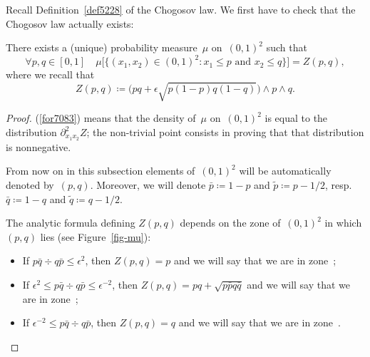 Recall Definition~\ref{def5228} of the Chogosov law.
We first have to check that the Chogosov law actually exists:
%
\begin{Clm}\label{clm4375}
There exists a (unique) probability measure~$\mu$ on~$(0,1)^2$ such that
\[\label{for7083}
\forall p,q \in [0,1] \quad \mu\big[\big\{(x_1,x_2)\in(0,1)^2 \colon 
x_1\leq p \text{ and } x_2\leq q\big\}\big] = Z(p,q) ,\]
where we recall that
\[ Z(p,q) \coloneqq \big( pq + \epsilon\sqrt{p(1-p)q(1-q)} \big) \wedge p\wedge q .\]
\end{Clm}

\begin{proof}
(\ref{for7083}) means that the density of~$\mu$ on~$(0,1)^2$ is equal to the distribution
$\partial^2_{x_1x_2}Z$; the non-trivial point consists in proving that
that distribution is nonnegative.

\begin{NOTA}
From now on in this subsection elements of~$(0,1)^2$ will be automatically denoted by~$(p,q)$.
Moreover, we will denote $\bar{p} \coloneqq 1-p$ and $\tilde{p} \coloneqq p-1/2$,
resp.\ $\bar{q} \coloneqq 1-q$ and $\tilde{q} \coloneqq q-1/2$.
\end{NOTA}

The analytic formula defining $Z(p,q)$ depends on the zone of~$(0,1)^2$
in which $(p,q)$ lies (see Figure~\ref{fig-mu}):
\begin{itemize}
\item If $p\bar{q} \div q\bar{p} \leq \epsilon^2$, then $Z(p,q) = p$ and we will say that we are in zone~\onecirc;
\item If $\epsilon^2 \leq p\bar{q} \div q\bar{p} \leq \epsilon^{-2}$, then $Z(p,q) = pq + \sqrt{p\bar{p}q\bar{q}}$
and we will say that we are in zone~\twocirc;
\item If $\epsilon^{-2} \leq p\bar{q} \div q\bar{p}$, then $Z(p,q) = q$ and we will say that we are in zone~\threecirc.
\end{itemize}
%
\begin{figure}
\centering
%
%
\end{figure}
\end{proof}
